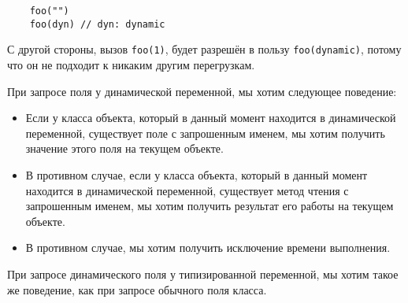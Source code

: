 \begin{verbatim}
    foo("")
    foo(dyn) // dyn: dynamic
\end{verbatim} 

С другой стороны, вызов \texttt{foo(1)}, будет разрешён в пользу \texttt{foo(dynamic)}, потому что он не подходит к никаким другим перегрузкам.

При запросе поля у динамической переменной, мы хотим следующее поведение:

\begin{itemize}
    \item Если у класса объекта, который в данный момент находится в динамической переменной, существует поле с запрошенным именем, мы хотим получить значение этого поля на текущем объекте.
    \item В противном случае, если у класса объекта, который в данный момент находится в динамической переменной, существует метод чтения с запрошенным именем, мы хотим получить результат его работы на текущем объекте.
    \item В противном случае, мы хотим получить исключение времени выполнения.
\end{itemize}

При запросе динамического поля у типизированной переменной, мы хотим такое же поведение, как при запросе обычного поля класса.